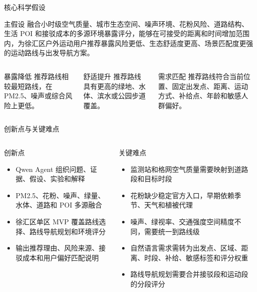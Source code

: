 \documentclass[xcolor=table,dvipsnames,svgnames,aspectratio=169]{ctexbeamer}
\newcommand{\smallitem}{\setlength{\itemsep}{0.25em}}
\begin{document}
\begin{frame}{核心科学假设}
  \begin{block}{主假设}
    融合小时级空气质量、城市生态空间、噪声环境、花粉风险、道路结构、生活 POI 和接驳成本的多源环境暴露评分，能够在可接受的距离和时间增加范围内，为徐汇区户外运动用户推荐暴露风险更低、生态舒适度更高、场景匹配度更强的运动路线与出发导航方案。
  \end{block}

  \vspace{0.4em}
  \begin{columns}[T]
    \begin{exampleblock}{暴露降低}
      推荐路线相较最短路线，在 PM2.5、噪声或综合风险上更低。
    \end{exampleblock}
    \begin{exampleblock}{舒适提升}
      推荐路线具有更高的绿地、水体、滨水或公园步道覆盖。
    \end{exampleblock}
    \begin{exampleblock}{需求匹配}
      推荐路线符合当前位置、固定出发点、距离、运动方式、补给点、年龄和敏感人群偏好。
    \end{exampleblock}
  \end{columns}
\end{frame}

\begin{frame}{创新点与关键难点}
  \small
  \begin{columns}[T]
    \begin{block}{创新点}
      \begin{itemize}
        \smallitem
        \item Qwen Agent 组织问题、证据、假设、实验和解释
        \item PM2.5、花粉、噪声、绿量、水体、道路和 POI 多源融合
        \item 徐汇区单区 MVP 覆盖路线选择、路线导航规划和环境评分
        \item 输出推荐理由、风险来源、接驳成本和用户偏好匹配说明
      \end{itemize}
    \end{block}

    \begin{alertblock}{关键难点}
      \begin{itemize}
        \smallitem
        \item 监测站和格网空气质量需要映射到道路段和目标时段
        \item 花粉缺少稳定官方入口，早期依赖季节、天气和植被代理
        \item 噪声、绿视率、交通强度空间精度不同，需要统一到路线级
        \item 自然语言需求需转为出发点、区域、距离、时段、补给、敏感标签和评分权重
        \item 路线导航规划需要合并接驳段和运动段的分段评分
      \end{itemize}
    \end{alertblock}
  \end{columns}
\end{frame}
\end{document}
